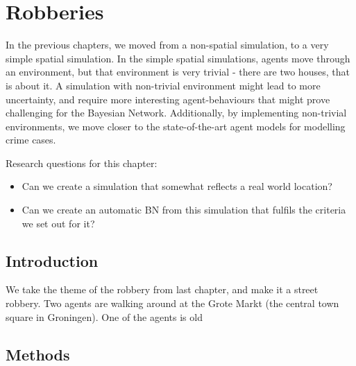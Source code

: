  

\chapter[Robberies in ``real'' locations]{Robberies}

In the previous chapters, we moved from a non-spatial simulation, to a very simple spatial simulation. In the simple spatial simulations, agents move through an environment, but that environment is very trivial - there are two houses, that is about it. A simulation with non-trivial environment might lead to more uncertainty, and require more interesting agent-behaviours that might prove challenging for the Bayesian Network. Additionally, by implementing non-trivial environments, we move closer to the state-of-the-art agent models for modelling crime cases.


Research questions for this chapter:

\begin{itemize}
\item Can we create a simulation that somewhat reflects a real world location?
\item Can we create an automatic BN from this simulation that fulfils the criteria we set out for it?
\end{itemize}



\section{Introduction}
We take the theme of the robbery from last chapter, and make it a street robbery. Two agents are walking around at the Grote Markt (the central town square in Groningen). One of the agents is old

\section{Methods}

